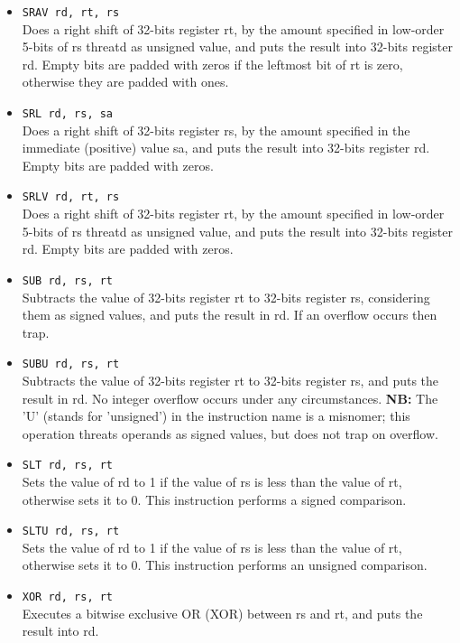 \documentclass[12pt]{report}
\newcommand{\MISN}{\textbf{NB:} The 'U' (stands for 'unsigned') in the instruction name is a misnomer; 
this operation threats operands as signed values, but does not trap on overflow.}
\begin{document}
\begin{itemize}
	\item \texttt{SRAV rd, rt, rs}\\
	Does a right shift of 32-bits register rt, by the amount specified in low-order 5-bits of rs threatd as unsigned value,
	and puts the result into 32-bits register rd. Empty bits are padded with zeros if the leftmost bit
	of rt is zero, otherwise they are padded with ones.

	\item \texttt{SRL rd, rs, sa}\\
	Does a right shift of 32-bits register rs, by the amount specified in the immediate (positive) value sa,
	and puts the result into 32-bits register rd. Empty bits are padded with zeros.
	
	\item \texttt{SRLV rd, rt, rs}\\
	Does a right shift of 32-bits register rt, by the amount specified in low-order 5-bits of rs threatd as unsigned value,
	and puts the result into 32-bits register rd. Empty bits are padded with zeros.

	\item \texttt{SUB rd, rs, rt}\\
	Subtracts the value of 32-bits register rt to 32-bits register rs, considering them as signed values, and
	puts the result in rd. If an overflow occurs then trap.

	\item \texttt{SUBU rd, rs, rt}\\
	Subtracts the value of 32-bits register rt to 32-bits register rs, and
	puts the result in rd. No integer overflow occurs under any circumstances.
	\MISN{}

	\item \texttt{SLT rd, rs, rt}\\
	Sets the value of rd to 1 if the value of rs is less than the value of rt,
	otherwise sets it to 0. This instruction performs a signed comparison.

	\item \texttt{SLTU rd, rs, rt}\\
	Sets the value of rd to 1 if the value of rs is less than the value of rt,
	otherwise sets it to 0. This instruction performs an unsigned comparison.

	\item \texttt{XOR rd, rs, rt}\\
	Executes a bitwise exclusive OR (XOR) between rs and rt, and puts the result into rd.
\end{itemize}
\end{document}
